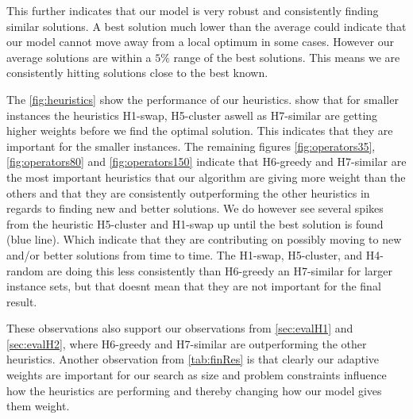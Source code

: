 \documentclass[../main.tex]{subfiles}
\begin{document}
This further indicates that our model is very robust and consistently finding similar solutions.
A best solution much lower than the average could indicate that our model cannot move away from a local optimum in some cases.
However our average solutions are within a $5\%$ range of the best solutions.
This means we are consistently hitting solutions close to the best known.
\par
The \cref{fig:heuristics} show the performance of our heuristics.
 show that for smaller instances the heuristics H1-swap, H5-cluster aswell as H7-similar are getting higher weights before we find the optimal solution. This indicates that they are important for the smaller instances.
The remaining figures \ref{fig:operators35}, \ref{fig:operators80} and \ref{fig:operators150} indicate that H6-greedy and H7-similar are the most important heuristics that our algorithm are giving more weight than the others and that they are consistently outperforming the other heuristics in regards to finding new and better solutions. 
We do however see several spikes from the heuristic H5-cluster and H1-swap up until the best solution is found (blue line). 
Which indicate that they are contributing on possibly moving to new and/or better solutions from time to time. 
The H1-swap, H5-cluster, and H4-random are doing this less consistently than H6-greedy an H7-similar for larger instance sets, but that doesnt mean that they are not important for the final result. \par
These observations also support our observations from \cref{sec:evalH1} and \cref{sec:evalH2}, where H6-greedy and H7-similar are outperforming the other heuristics. 
Another observation from \cref{tab:finRes} is that clearly our adaptive weights are important for our search as size and problem constraints influence how the heuristics are performing and thereby changing how our model gives them weight. 

\biblio                                                         
\end{document}
